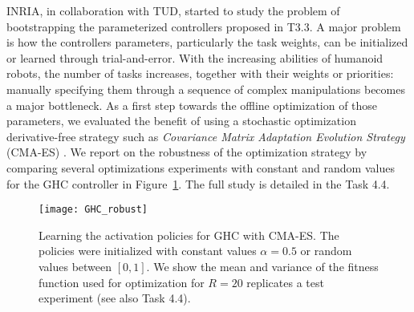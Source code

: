 INRIA, in collaboration with TUD, started to study the problem of bootstrapping the parameterized controllers proposed in T3.3. A major problem is how the controllers parameters, particularly the task weights, can be initialized or learned through trial-and-error. With the increasing abilities of humanoid robots, the number of tasks increases, together with their weights or priorities: manually specifying them through a sequence of complex manipulations becomes a major bottleneck. 
As a first step towards the offline optimization of those parameters, we evaluated the benefit of using a stochastic optimization derivative-free strategy such as \textit{Covariance Matrix Adaptation Evolution Strategy} (CMA-ES) \cite{Hansen-2001-ID362}. We report on the robustness of the optimization strategy by comparing several optimizations experiments with constant and random values for the GHC controller in Figure~\ref{fig:robust}.
The full study is detailed in the Task 4.4.

\begin{figure}[h!]
  \centering
  \texttt{[image: GHC\_robust]}
\caption{Learning the activation policies for GHC with CMA-ES. The policies were initialized with constant values $\alpha=0.5$ or random values between $[0,1]$. We show the mean and variance of the fitness function used for optimization for $R=20$ replicates a test experiment (see also Task 4.4).}
\label{fig:robust}
\end{figure}
